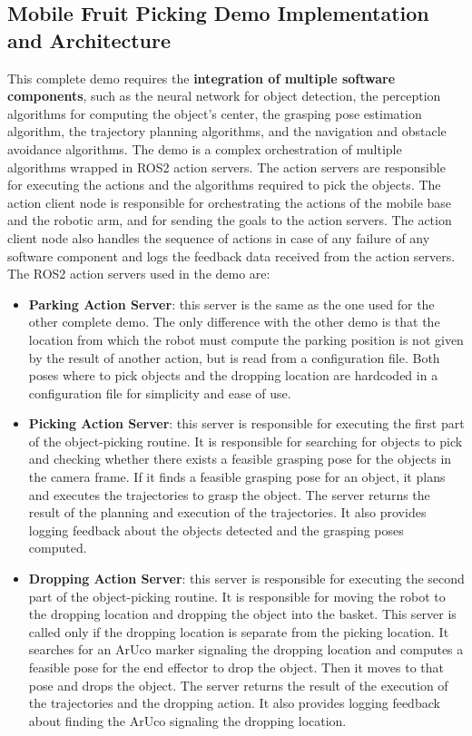 \subsection{Mobile Fruit Picking Demo Implementation and Architecture}
\label{sec:demo2}

This complete demo requires the \textbf{integration of multiple software components},
such as the neural network for object detection,
the perception algorithms for computing the object's center, the grasping pose estimation algorithm, the trajectory
planning algorithms, and the navigation and obstacle avoidance algorithms. The demo is a complex orchestration of
multiple algorithms wrapped in ROS2 action servers. The action servers are responsible for executing the actions
and the algorithms required to pick the objects. The action client node is responsible for orchestrating the actions
of the mobile base and the robotic arm, and for sending the goals to the action servers. The action client node
also handles the sequence of actions in case of any failure of any software component and logs the feedback data
received from the action servers. The ROS2 action servers used in the demo are:

\begin{itemize}
    \item \textbf{Parking Action Server}: this server is the same as the one used for the other complete demo.
    The only difference with the other demo is that the location from which the robot must compute
    the parking position is not given by the result of another action, but is read from a configuration file.
    Both poses where to pick objects and the dropping location are hardcoded in a configuration file for
    simplicity and ease of use.
    \item \textbf{Picking Action Server}: this server is responsible for executing the first part of the
    object-picking routine. It is responsible for searching for objects to pick and checking whether there
    exists a feasible grasping pose for the objects in the camera frame. If it finds a feasible grasping pose
    for an object, it plans and executes the trajectories to grasp the object. The server returns the result
    of the planning and execution of the trajectories. It also provides logging feedback about the objects
    detected and the grasping poses computed.
    \item \textbf{Dropping Action Server}: this server is responsible for executing the second part of the
    object-picking routine. It is responsible for moving the robot to the dropping location and dropping the object
    into the basket. This server is called only if the dropping location is separate from the picking location.
    It searches for an ArUco marker signaling the dropping location and computes a feasible pose for the end effector
    to drop the object. Then it moves to that pose and drops the object.
    The server returns the result of the execution of the trajectories and the dropping action.
    It also provides logging feedback about finding the ArUco signaling the dropping location. 
\end{itemize}

